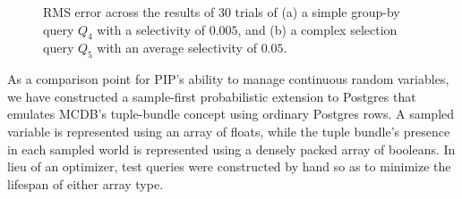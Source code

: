 \begin{figure}
\begin{center}
\vspace*{-0.1in}
\caption{RMS error across the results of 30 trials of (a) a simple group-by query $Q_4$ with a selectivity of $0.005$, and (b) a complex selection query $Q_5$ with an average selectivity of $0.05$.}
\label{fig:variance}
\end{center}
\vspace*{-0.20in}
\end{figure}

As a comparison point for PIP's ability to manage continuous random variables, we have constructed a sample-first probabilistic extension to Postgres that emulates MCDB's tuple-bundle concept using ordinary Postgres rows.  A sampled variable is represented using an array of floats, while the tuple bundle's presence in each sampled world is represented using a densely packed array of booleans.  In lieu of an optimizer, test queries were constructed by hand so as to minimize the lifespan of either array type.


